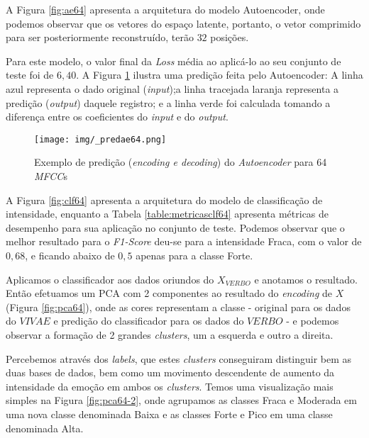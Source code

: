 
A Figura \ref{fig:ae64} apresenta a arquitetura do modelo Autoencoder, onde podemos observar que os vetores do espaço latente, portanto, o vetor comprimido para ser posteriormente reconstruído, terão $32$ posições.

Para este modelo, o valor final da \textit{Loss} média ao aplicá-lo ao seu conjunto de teste foi de $6,40$. A Figura \ref{fig:predae64} ilustra uma predição feita pelo Autoencoder: A linha azul representa o dado original (\textit{input});a linha tracejada laranja representa a predição (\textit{output}) daquele registro; e a linha verde foi calculada tomando a diferença entre os coeficientes do \textit{input} e do \textit{output}.

\begin{figure}[h]
    \centering
    \texttt{[image: img/\_predae64.png]}
    \caption{\label{fig:predae64}Exemplo de predição (\textit{encoding e decoding}) do \textit{Autoencoder} para 64 \textit{MFCC}s}
\end{figure}

A Figura \ref{fig:clf64} apresenta a arquitetura do modelo de classificação de intensidade, enquanto a Tabela \ref{table:metricasclf64} apresenta métricas de desempenho para sua aplicação no conjunto de teste. Podemos observar que o melhor resultado para o \textit{F1-Score} deu-se para a intensidade Fraca, com o valor de $0,68$, e ficando abaixo de $0,5$ apenas para a classe Forte.

Aplicamos o classificador aos dados oriundos do $X_{VERBO}$ e anotamos o resultado. Então efetuamos um \acrshort{PCA} com 2 componentes ao resultado do \textit{encoding} de $X$ (Figura \ref{fig:pca64}), onde as cores representam a classe - original para os dados do $VIVAE$ e predição do classificador para os dados do $VERBO$ - e podemos observar a formação de 2 grandes \textit{clusters}, um a esquerda e outro a direita.

Percebemos através dos \textit{labels}, que estes \textit{clusters} conseguiram distinguir bem as duas bases de dados, bem como um movimento descendente de aumento da intensidade da emoção em ambos os \textit{clusters}. Temos uma visualização mais simples na Figura \ref{fig:pca64-2}, onde agrupamos as classes Fraca e Moderada em uma nova classe denominada Baixa e as classes Forte e Pico em uma classe denominada Alta.

